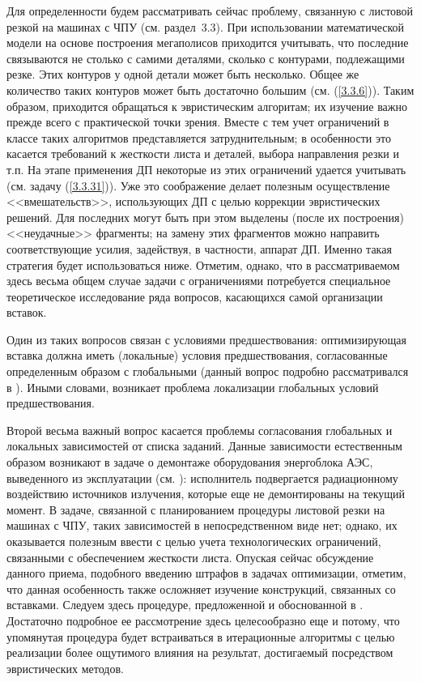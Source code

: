 Для определенности будем рассматривать сейчас проблему, связанную с
листовой резкой на машинах с ЧПУ (см. раздел~3.3). При использовании
математической модели на основе построения мегаполисов приходится учитывать,
что последние связываются не столько с самими деталями, сколько с контурами,
подлежащими резке. Этих контуров у одной детали может быть несколько.
Общее же количество таких контуров может быть достаточно большим
(см. (\ref{3.3.6})). Таким образом, приходится обращаться к эвристическим
алгоритам; их изучение важно прежде всего с практической точки зрения.
Вместе с тем учет ограничений в классе таких алгоритмов представляется
затруднительным; в особенности это касается требований к жесткости листа
и деталей, выбора направления резки и т.п. На этапе применения ДП некоторые
из этих ограничений удается учитывать (см. задачу (\ref{3.3.31})).  Уже это
соображение делает полезным осуществление <<вмешательств>>, использующих ДП
с целью коррекции эвристических решений. Для последних могут быть при этом
выделены (после их построения) <<неудачные>> фрагменты; на замену этих
фрагментов можно направить соответствующие  усилия, задействуя, в частности,
аппарат ДП. Именно такая стратегия будет использоваться ниже. Отметим,
однако, что в рассматриваемом здесь весьма общем случае задачи с ограничениями
потребуется специальное теоретическое исследование ряда вопросов, касающихся
самой организации вставок.

Один из таких вопросов  связан с условиями предшествования: оптимизирующая
вставка должна иметь (локальные) условия предшествования, согласованные
определенным образом с глобальными (данный вопрос подробно рассматривался
в \cite{Cha14`}). Иными словами, возникает проблема локализации глобальных
условий предшествования.

Второй весьма важный вопрос касается проблемы согласования глобальных и
локальных зависимостей от списка заданий. Данные зависимости естественным
образом возникают в задаче о демонтаже оборудования энергоблока АЭС,
выведенного из эксплуатации (см. \cite{Cha2`}): исполнитель подвергается
радиационному воздействию источников излучения, которые еще не демонтированы
на текущий момент. В задаче, связанной с планированием процедуры листовой
резки на машинах с ЧПУ, таких зависимостей в непосредственном виде нет;
однако, их оказывается полезным ввести с целью учета технологических
ограничений, связанными с обеспечением жесткости листа. Опуская сейчас
обсуждение данного приема, подобного введению штрафов в задачах оптимизации,
отметим, что данная особенность также осложняет изучение конструкций,
связанных со вставками. Следуем здесь процедуре, предложенной и обоснованной
в \cite{Cha13`}. Достаточно подробное ее рассмотрение здесь целесообразно
еще и потому, что упомянутая процедура будет встраиваться в итерационные
алгоритмы с целью реализации более ощутимого влияния на результат,
достигаемый посредством эвристических методов.

